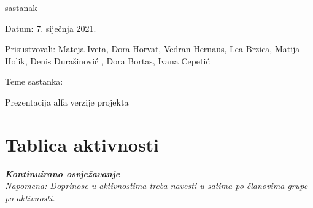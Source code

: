 \begin{packed_enum}
			\item sastanak
			\item[] \begin{packed_item}
				\item Datum: 7. siječnja 2021.
				\item Prisustvovali: Mateja Iveta, Dora Horvat, Vedran Hernaus, Lea Brzica, Matija Holik, Denis Đurašinović , Dora Bortas, Ivana Cepetić
				\item Teme sastanka:
				\begin{packed_item}
					\item Prezentacija alfa verzije projekta
				\end{packed_item}
			\end{packed_item}
			
			
		\end{packed_enum}
		
		\eject
		\section*{Tablica aktivnosti}
		
			\textbf{\textit{Kontinuirano osvježavanje}}\\
			
			 \textit{Napomena: Doprinose u aktivnostima treba navesti u satima po članovima grupe po aktivnosti.}
					
						
			
